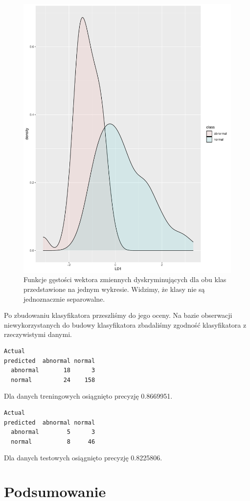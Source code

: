 \documentclass[10pt,a4paper]{article}
\begin{document}
\begin{figure}[H]
\includegraphics[scale=0.5]{density.pdf}
\caption{Funkcje gęstości wektora zmiennych dyskryminujących dla obu klas przedstawione na jednym wykresie. Widzimy, że klasy nie są jednoznacznie separowalne.}
\end{figure}

Po zbudowaniu klasyfikatora przeszliśmy do jego oceny. Na bazie obserwacji niewykorzystanych do budowy klasyfikatora zbadaliśmy zgodność klasyfikatora z rzeczywistymi danymi. 

\begin{lstlisting}[caption={Macierz pomyłek dla danych treningowych}]
          Actual
predicted  abnormal normal
  abnormal       18      3
  normal         24    158
\end{lstlisting}
Dla danych treningowych osiągnięto precyzję 0.8669951.

\begin{lstlisting}[caption={Macierz pomyłek dla danych testowych}]
          Actual
predicted  abnormal normal
  abnormal        5      3
  normal          8     46
\end{lstlisting}
Dla danych testowych osiągnięto precyzję 0.8225806.



\newpage
\section{Podsumowanie}
\end{document}
